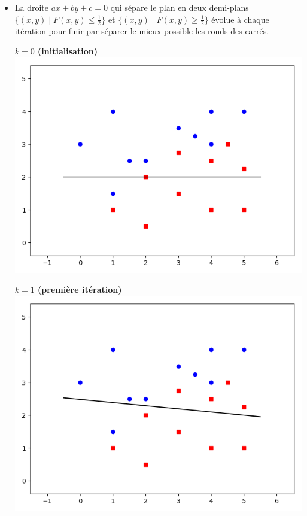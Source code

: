 {\begin{exemple}{}{}
\begin{itemize}
		
		
		\item La droite $ax+by+c=0$ qui sépare le plan en deux demi-plans $\{ (x,y) \mid F(x,y)\le\frac12\}$ et $\{ (x,y) \mid F(x,y)\ge\frac12\}$ évolue à chaque itération pour finir par séparer le mieux possible les ronds des carrés.
		
		\begin{center}
			\begin{minipage}{0.45\textwidth}
				\center \textbf{$k=0$ (initialisation)} 
				\includegraphics[scale=\myscale,scale=0.4]{figures/retro_01_b}
			\end{minipage}
			\begin{minipage}{0.45\textwidth}
				\center \textbf{$k=1$ (première itération)}
				\includegraphics[scale=\myscale,scale=0.4]{figures/retro_01_c}
			\end{minipage}
			

\end{center}
\end{itemize}
\end{exemple}}
